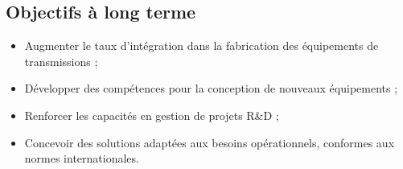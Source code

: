 \documentclass[12pt,a4paper,oneside]{report}
\begin{document}
\subsection{Objectifs à long terme}
\label{subsec:objectifs_labo}

\begin{itemize}
    \item Augmenter le taux d’intégration dans la fabrication des équipements de transmissions ;
    \item Développer des compétences pour la conception de nouveaux équipements ;
    \item Renforcer les capacités en gestion de projets R\&D ;
    \item Concevoir des solutions adaptées aux besoins opérationnels, conformes aux normes internationales.
\end{itemize}
\end{document}
